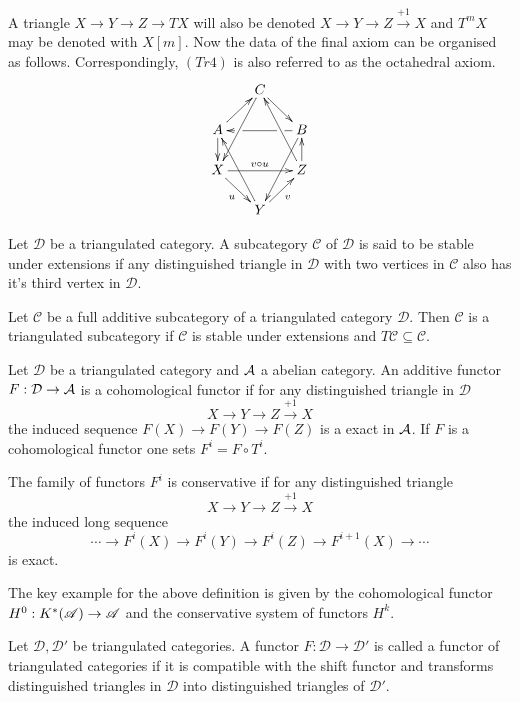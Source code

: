 A triangle $X\to Y \to Z \to TX$ will also be denoted $X\to Y \to Z \xrightarrow{+1} X$ and $T^m X$ may be denoted with $X[m]$.
Now the data of the final axiom can be organised as follows.
Correspondingly, $(Tr4)$ is also referred to as the octahedral axiom.
\begin{equation*}
\xymatrix@=1.6em{
& C \ar@{->}[dr] \ar[ddl] & \\
A \ar@{->}[ur] \ar[d]& &
   B\ar[ll]|(0.25)\hole|(0.75)\hole
      \ar[ddl] \\
X \ar[rr]^{v \circ u} \ar[dr]_u & &
   Z \ar[u] \ar[uul]\\
& Y \ar[ur]_v \ar[uul]&
}
\end{equation*}
\begin{definition}
 Let $\mathcal{D}$ be a triangulated category. A subcategory $\mathcal{C}$ of $\mathcal{D}$ is said to be stable under extensions if any distinguished triangle in $\mathcal{D}$ with two vertices in $\mathcal{C}$ also has it's third vertex in $\mathcal{D}$.
\end{definition}
\begin{definition}
 Let $\mathcal{C}$ be a full additive subcategory of a triangulated category $\mathcal{D}$. Then $\mathcal{C}$ is a triangulated subcategory if $\mathcal{C}$ is stable under extensions and $T\mathcal{C}\subseteq \mathcal{C}$.
\end{definition}

\begin{definition}
 Let $\mathcal{D}$ be a triangulated category and $\AA$ a abelian category.
 An additive functor $F:\mathcal{D} \to \AA$ is a cohomological functor if for any distinguished triangle in $\mathcal{D}$
 $$X \to Y \to Z\xrightarrow{+1} X $$
 the induced sequence $F(X) \to F(Y) \to F(Z) $
 is a exact in $\AA$. If $F$ is a cohomological functor one sets $F^i = F\circ T^i$.

 The family of functors $F^i$ is conservative if for any distinguished triangle
 $$X \to Y \to Z \xrightarrow{+1} X$$
 the induced long sequence
 $$\cdots \to F^i(X) \to F^i(Y) \to F^i(Z) \to F^{i+1}(X) \to \cdots $$
 is exact.
\end{definition}
The key example for the above definition is given by the cohomological functor $H^0: K^*(\A) \to \A$ and the conservative system of functors $H^k$.
\begin{definition}
 Let $\mathcal{D}, \mathcal{D}'$ be triangulated categories.
 A functor $F:\mathcal{D} \to \mathcal{D}'$ is called a functor of triangulated categories if it is compatible with the shift functor and transforms distinguished triangles in $\mathcal{D}$ into distinguished triangles of $\mathcal{D}'$.
\end{definition}
